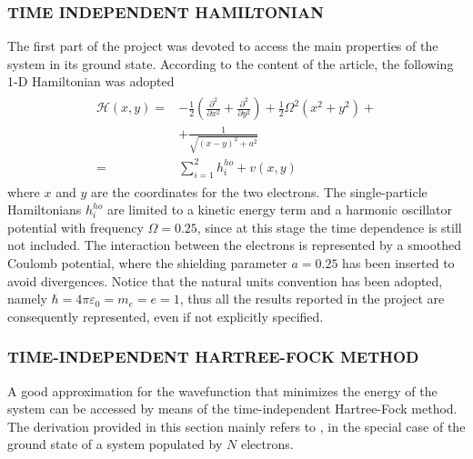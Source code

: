 \subsubsection{TIME INDEPENDENT HAMILTONIAN}
The first part of the project was devoted to access the main properties of the system in its ground state. According to the content of the article, the following 1-D Hamiltonian was adopted
\begin{align}
\begin{split}
    \mathcal{H}(x,y) =& -\frac{1}{2} \left( \frac{\partial^2}{\partial x^2} + \frac{\partial^2}{\partial y^2} \right) + \frac{1}{2} \Omega^2 (x^2 + y^2) + \\
    & + \frac{1}{\sqrt{(x-y)^2 + a^2}} \\
    =& \sum_{i=1}^2 h_{i}^{ho} + v(x,y)
\end{split}
\label{eq:hamiltonian_t_indep}
\end{align}
where $x$ and $y$ are the coordinates for the two electrons. The single-particle Hamiltonians $h_i^{ho}$ are limited to a kinetic energy term and a harmonic oscillator potential with frequency $\Omega=0.25$, since at this stage the time dependence is still not included. The interaction between the electrons is represented by a smoothed Coulomb potential, where the shielding parameter $a=0.25$ has been inserted to avoid divergences. Notice that the natural units convention has been adopted, namely $\hbar=4\pi\varepsilon_0=m_e=e=1$, thus all the results reported in the project are consequently represented, even if not explicitly specified. \\

\subsubsection{TIME-INDEPENDENT HARTREE-FOCK METHOD}
A good approximation for the wavefunction that minimizes the energy of the system can be accessed by means of the time-independent Hartree-Fock method. The derivation provided in this section mainly refers to \cite{bransden}, in the special case of the ground state of a system populated by $N$ electrons. \\

